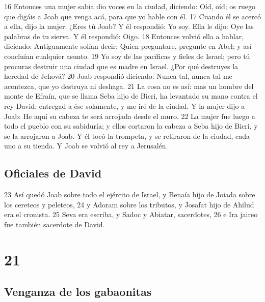 16 Entonces una mujer sabia dio voces en la ciudad, diciendo: Oíd, oíd; os ruego que digáis a Joab que venga acá, para que yo hable con él.
17 Cuando él se acercó a ella, dijo la mujer: ¿Eres tú Joab? Y él respondió: Yo soy. Ella le dijo: Oye las palabras de tu sierva. Y él respondió: Oigo.
18 Entonces volvió ella a hablar, diciendo: Antiguamente solían decir: Quien preguntare, pregunte en Abel; y así concluían cualquier asunto.
19 Yo soy de las pacíficas y fieles de Israel; pero tú procuras destruir una ciudad que es madre en Israel. ¿Por qué destruyes la heredad de Jehová?
20 Joab respondió diciendo: Nunca tal, nunca tal me acontezca, que yo destruya ni deshaga.
21 La cosa no es así: mas un hombre del monte de Efraín, que se llama Seba hijo de Bicri, ha levantado su mano contra el rey David; entregad a ése solamente, y me iré de la ciudad. Y la mujer dijo a Joab: He aquí su cabeza te será arrojada desde el muro.
22 La mujer fue luego a todo el pueblo con su sabiduría; y ellos cortaron la cabeza a Seba hijo de Bicri, y se la arrojaron a Joab. Y él tocó la trompeta, y se retiraron de la ciudad, cada uno a su tienda. Y Joab se volvió al rey a Jerusalén.

\section*{Oficiales de David }

23 Así quedó Joab sobre todo el ejército de Israel, y Benaía hijo de Joiada sobre los cereteos y peleteos,
24 y Adoram sobre los tributos, y Josafat hijo de Ahilud era el cronista.
25 Seva era escriba, y Sadoc y Abiatar, sacerdotes,
26 e Ira jaireo fue también sacerdote de David.

\chapter{21}

\section*{Venganza de los gabaonitas}

